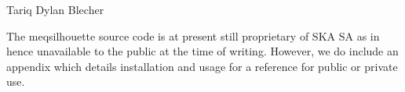 Tariq Dylan Blecher
 \clearpage
  \vspace*{\fill}
    \begin{center}
     \huge
     The {\sc meqsilhouette} source code is at present still proprietary of SKA SA as in hence unavailable to the public at the time of writing. However, we do include an appendix which details installation and usage for a reference for public or private use.
    \end{center}
  \vspace*{\fill}
\tableofcontents
{}
\listoffigures
{}
\listoftables
{}
